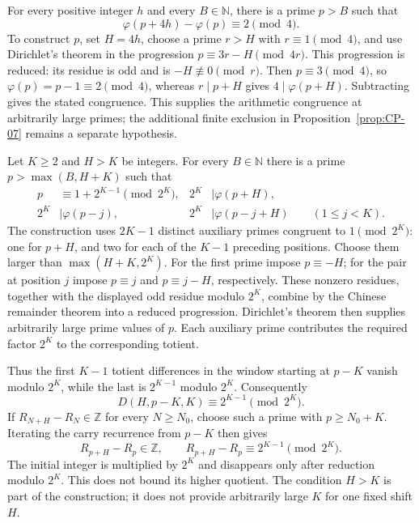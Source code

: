 \begin{prop}\label{prop:CP-05-inv}
For every positive integer $h$ and every $B\in\mathbb N$, there is
 a prime $p>B$ such that
\[
 \varphi(p+4h)-\varphi(p)\equiv2\pmod4.
\]
To construct $p$, set $H=4h$, choose a prime $r>H$ with
$r\equiv1\pmod4$, and use Dirichlet's theorem in the progression
$p\equiv3r-H\pmod{4r}$. This progression is reduced: its residue is
odd and is $-H\not\equiv0\pmod r$. Then $p\equiv3\pmod4$, so
$\varphi(p)=p-1\equiv2\pmod4$, whereas $r\mid p+H$ gives
$4\mid\varphi(p+H)$. Subtracting gives the stated congruence.
This supplies the arithmetic congruence at arbitrarily large primes;
the additional finite exclusion in Proposition~\ref{prop:CP-07}
remains a separate hypothesis.

\end{prop}

\begin{prop}\label{prop:TA-inv}
Let $K\ge2$ and $H>K$ be integers. For every $B\in\mathbb N$ there
is a prime $p>\max(B,H+K)$ such that
\[
\begin{aligned}
 p&\equiv1+2^{K-1}\pmod{2^K},&
 2^K&\mid\varphi(p+H),\\
 2^K&\mid\varphi(p-j),&
 2^K&\mid\varphi(p-j+H)\qquad(1\le j<K).
\end{aligned}
\]
The construction uses $2K-1$ distinct auxiliary primes congruent to
$1\pmod{2^K}$: one for $p+H$, and two for each of the $K-1$
preceding positions. Choose them larger than $\max(H+K,2^K)$.
For the first prime impose $p\equiv-H$; for the pair at position $j$
impose $p\equiv j$ and $p\equiv j-H$, respectively. These nonzero
residues, together with the displayed odd residue modulo $2^K$,
combine by the Chinese remainder theorem into a reduced progression.
Dirichlet's theorem then supplies arbitrarily large prime values of $p$.
Each auxiliary prime contributes the required factor $2^K$ to the
corresponding totient.

Thus the first $K-1$ totient differences in the window starting at
$p-K$ vanish modulo $2^K$, while the last is $2^{K-1}$ modulo $2^K$.
Consequently
\[
 D(H,p-K,K)\equiv2^{K-1}\pmod{2^K}.
\]
If $R_{N+H}-R_N\in\mathbb Z$ for every $N\ge N_0$, choose such a
prime with $p\ge N_0+K$. Iterating the carry recurrence from $p-K$
then gives
\[
 R_{p+H}-R_p\in\mathbb Z,\qquad
 R_{p+H}-R_p\equiv2^{K-1}\pmod{2^K}.
\]
The initial integer is multiplied by $2^K$ and disappears only after
reduction modulo $2^K$. This does not bound its higher quotient.
The condition $H>K$ is part of the construction; it does not provide
arbitrarily large $K$ for one fixed shift $H$.

\end{prop}

